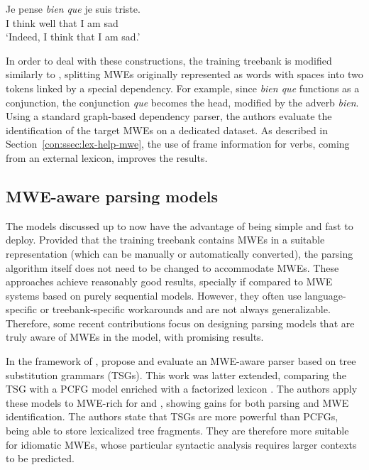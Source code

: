 \documentclass[output=paper]{langsci/langscibook}
\begin{document}
\ea
\gll Je pense {\textit{bien}} {\textit{que}}  je suis triste.\\  
     I  think well       that       I  am   sad\\
\glt `Indeed, I think that I am sad.'
\z

In order to deal with these constructions, the training treebank is modified similarly to \citet{candito2014strategies}, splitting MWEs originally represented as words with spaces into two tokens linked by a special dependency. 
For example, since \textit{bien que} functions as a conjunction, the conjunction \textit{que} becomes the head, modified by the adverb \textit{bien}. %
Using a standard graph-based dependency parser, the authors evaluate the identification of the target MWEs on a dedicated dataset. As described in Section~\ref{con:ssec:lex-help-mwe}, the use of  frame information for verbs, coming from an external lexicon, improves the results.


\subsection{MWE-aware parsing models}
\label{con:ssec:joint:model}

The models discussed up to now have the advantage of being simple and fast to deploy.
Provided that the training treebank contains MWEs in a suitable representation (which can be manually or automatically converted), the parsing algorithm itself does not need to be changed to accommodate MWEs.
These approaches achieve reasonably good results, specially if compared to MWE systems based on purely sequential models.
However, they often use language-specific or treebank-specific workarounds and are not always generalizable.
Therefore, some recent contributions focus on designing parsing models that are truly awa\-re of MWEs in the model, with promising results.

In the framework of , \citet{green11} propose and evaluate an MWE-aware parser based on tree substitution grammars (TSGs).
This work was latter extended, comparing the TSG with a PCFG model enriched with a factorized lexicon \citep{green13}.
The authors apply these models to MWE-rich  for  and , showing gains for both parsing and MWE identification.
The authors state that TSGs are more powerful than PCFGs, being able to store lexicalized tree fragments.
They are therefore more suitable for idiomatic MWEs, whose particular syntactic analysis requires larger contexts to be predicted.
\end{document}
